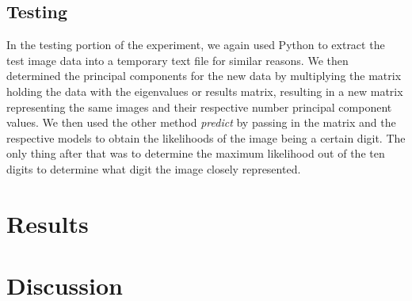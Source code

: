 \documentclass[twocolumn]{article}
\begin{document}
\subsection{Testing} %
\label{subsec:testing}
In the testing portion of the experiment, we again used Python to extract the test image data into a temporary text file for similar reasons. We then determined the principal components for the new data by multiplying the matrix holding the data with the eigenvalues or results matrix, resulting in a new matrix representing the same images and their respective number principal component values. We then used the other method \emph{predict} by passing in the matrix and the respective models to obtain the likelihoods of the image being a certain digit. The only thing after that was to determine the maximum likelihood out of the ten digits to determine what digit the image closely represented.
\section{Results} %
\label{sec:results}

\section{Discussion} %
\label{sec:discussion}
\cite{bayes}



\end{document}
